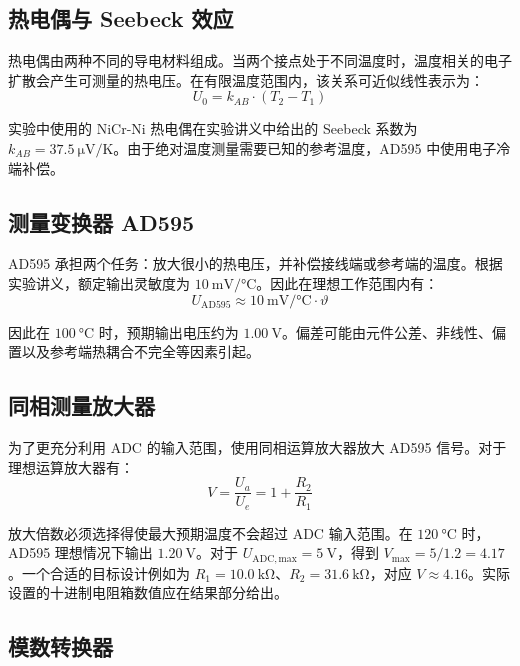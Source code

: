 \subsection{热电偶与 Seebeck 效应}

热电偶由两种不同的导电材料组成。当两个接点处于不同温度时，温度相关的电子扩散会产生可测量的热电压。在有限温度范围内，该关系可近似线性表示为：
\begin{equation}
  U_0 = k_{AB} \cdot (T_2 - T_1)
\end{equation}

实验中使用的 NiCr-Ni 热电偶在实验讲义中给出的 Seebeck 系数为 $k_{AB} = \SI{37.5}{\micro\volt\per\kelvin}$。由于绝对温度测量需要已知的参考温度，AD595 中使用电子冷端补偿。

\subsection{测量变换器 AD595}

AD595 承担两个任务：放大很小的热电压，并补偿接线端或参考端的温度。根据实验讲义，额定输出灵敏度为 $\SI{10}{\milli\volt\per\celsius}$。因此在理想工作范围内有：
\begin{equation}
  U_{\mathrm{AD595}} \approx \SI{10}{\milli\volt\per\celsius} \cdot \vartheta
\end{equation}

因此在 $\SI{100}{\celsius}$ 时，预期输出电压约为 $\SI{1.00}{\volt}$。偏差可能由元件公差、非线性、偏置以及参考端热耦合不完全等因素引起。

\subsection{同相测量放大器}

为了更充分利用 ADC 的输入范围，使用同相运算放大器放大 AD595 信号。对于理想运算放大器有：
\begin{equation}
  V = \frac{U_a}{U_e} = 1 + \frac{R_2}{R_1}
\end{equation}

放大倍数必须选择得使最大预期温度不会超过 ADC 输入范围。在 $\SI{120}{\celsius}$ 时，AD595 理想情况下输出 $\SI{1.20}{\volt}$。对于 $U_{\mathrm{ADC,max}} = \SI{5}{\volt}$，得到 $V_{\max} = 5/1.2 = 4.17$。一个合适的目标设计例如为 $R_1 = \SI{10.0}{\kilo\ohm}$、$R_2 = \SI{31.6}{\kilo\ohm}$，对应 $V \approx 4.16$。实际设置的十进制电阻箱数值应在结果部分给出。

\subsection{模数转换器}

